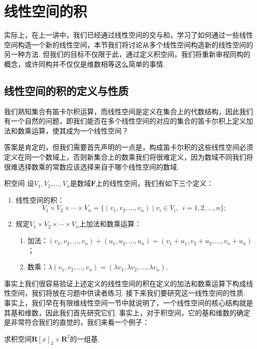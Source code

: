 \section{线性空间的积}

实际上，在上一讲中，我们已经通过线性空间的交与和，学习了如何通过一些线性空间构造一个新的线性空间，本节我们将讨论从多个线性空间构造新的线性空间的另一种方法. 但我们的目标不仅限于此，通过定义积空间，我们将重新审视同构的概念，或许同构并不仅仅是维数相等这么简单的事情.

\subsection{线性空间的积的定义与性质}

我们熟知集合有笛卡尔积运算，而线性空间是定义在集合上的代数结构，因此我们有一个自然的问题，即我们能否在多个线性空间的对应的集合的笛卡尔积上定义加法和数乘运算，使其成为一个线性空间？

答案是肯定的，但我们需要首先声明的一点是，构成笛卡尔积的这些线性空间必须定义在同一个数域上，否则新集合上的数乘我们将很难定义，因为数域不同我们将很难选择数乘的常数应该选择来自于哪个线性空间的数域.
\begin{definition}{}{积空间}
    设$V_1,V_2,\ldots,V_n$是数域$\mathbf{F}$上的线性空间，我们有如下三个定义：
    \begin{enumerate}
        \item 线性空间的积：
              \[V_1 \times V_2 \times \cdots \times V_n=\{(v_1,v_2,\ldots,v_n)\mid v_i \in V_i,\enspace i=1,2,\ldots,n\};\]

        \item 规定$V_1 \times V_2 \times \cdots \times V_n$上加法和数乘运算：
              \begin{enumerate}
                  \item 加法：$(v_1,v_2,\ldots,v_n)+(u_1,u_2,\ldots,u_n)=(v_1+u_1,v_2+u_2,\ldots,v_n+u_n)$；

                  \item 数乘：$\lambda(v_1,v_2,\ldots,v_n)=(\lambda v_1,\lambda v_2,\ldots,\lambda v_n)$.
              \end{enumerate}
    \end{enumerate}
\end{definition}

事实上我们很容易验证上述定义的线性空间的积在定义的加法和数乘运算下构成线性空间，我们将放在习题中供读者练习. 接下来我们要研究这一线性空间的性质. 事实上，我们早在有限维线性空间一节中就说明了，一个线性空间的核心结构就是其基和维数，因此我们首先研究它们. 事实上，对于积空间，它的基和维数的确定是非常符合我们的直觉的，我们来看一个例子：
\begin{example}{}{}
    求积空间$\mathbf{R}[x]_3\times\mathbf{R}^2$的一组基.
\end{example}

